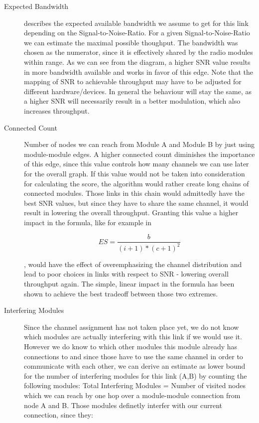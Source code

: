 	\begin{description}
	  \item[Expected Bandwidth]
	    describes the expected available bandwidth we assume to get for this link depending on the Signal-to-Noise-Ratio.
	    For a given Signal-to-Noise-Ratio we can estimate the maximal possible thoughput.
	    The bandwidth was chosen as the numerator, since it is effectively shared by the radio modules within range.
	    As we can see from the diagram, a higher SNR value results in more bandwidth available and works in favor of this edge.
	    Note that the mapping of SNR to achievable throughput may have to be adjusted for different hardware/devices. 
	    In general the behaviour will stay the same, as a higher SNR will necessarily result in a better modulation, which
	    also increases throughput.
	  
	  \item[Connected Count]
	    Number of nodes we can reach from Module A and Module B by just using module-module edges. 
	    A higher connected count diminishes the importance of this edge, since this value controls how many channels we can use later for the overall graph.
	    If this value would not be taken into consideration for calculating the score, the algorithm would rather create long chains of connected modules. 
	    Those links in this chain would admittedly have the best SNR values, but since they have to share the same channel, it would result in lowering the overall throughput.
	    Granting this value a higher impact in the formula, like for example in 
	    
	    \begin{equation}
	      ES=\frac{b}{(i + 1)* (c + 1)^2}
	    \end{equation}
	    
	    , would have the effect of overemphasizing 
	    the channel distribution and lead to poor choices in links with respect to SNR - lowering overall throughput again.
	    The simple, linear impact in the formula has been shown to achieve the best tradeoff between those two extremes.
	    
	  \item[Interfering Modules]
	    Since the channel assignment has not taken place yet, we do not know which modules are actually interfering with this link if we would use it.
	    However we do know to which other modules this module already has connections to and since those have to use the same channel in order to communicate with each
	    other, we can derive an estimate as lower bound for the number of interfering modules for this link (A,B) by counting the following modules:
	    Total Interfering Modules = Number of visited nodes which we can reach by one hop over a module-module connection from node A and B.
	    Those modules definetly interfer with our current connection, since they:
	    

\end{description}
